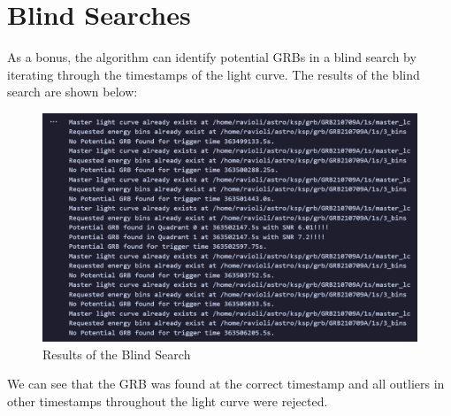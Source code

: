 \documentclass[11pt]{book} %
\begin{document}


\section{Blind Searches}
As a bonus, the algorithm can identify potential GRBs in a blind search by iterating through the timestamps of the light curve. The results of the blind search are shown below:

\begin{figure}[H]
    \centering
    \includegraphics[width=\textwidth]{Pictures/blindsearch.png}
    \caption{Results of the Blind Search}
\end{figure}

We can see that the GRB was found at the correct timestamp and all outliers in other timestamps throughout the light curve were rejected.








\end{document}
